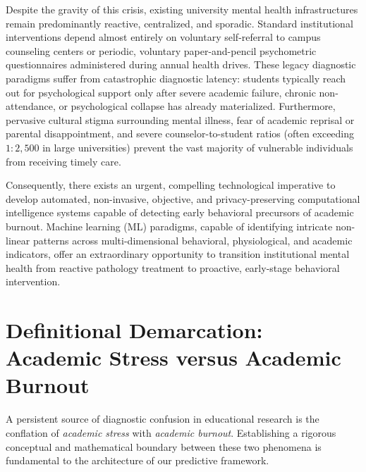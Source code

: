 \documentclass[12pt,a4paper,oneside]{report}
\begin{document}
Despite the gravity of this crisis, existing university mental health infrastructures remain predominantly reactive, centralized, and sporadic. Standard institutional interventions depend almost entirely on voluntary self-referral to campus counseling centers or periodic, voluntary paper-and-pencil psychometric questionnaires administered during annual health drives. These legacy diagnostic paradigms suffer from catastrophic diagnostic latency: students typically reach out for psychological support only after severe academic failure, chronic non-attendance, or psychological collapse has already materialized. Furthermore, pervasive cultural stigma surrounding mental illness, fear of academic reprisal or parental disappointment, and severe counselor-to-student ratios (often exceeding $1:2,500$ in large universities) prevent the vast majority of vulnerable individuals from receiving timely care.

Consequently, there exists an urgent, compelling technological imperative to develop automated, non-invasive, objective, and privacy-preserving computational intelligence systems capable of detecting early behavioral precursors of academic burnout. Machine learning (ML) paradigms, capable of identifying intricate non-linear patterns across multi-dimensional behavioral, physiological, and academic indicators, offer an extraordinary opportunity to transition institutional mental health from reactive pathology treatment to proactive, early-stage behavioral intervention.

\section{Definitional Demarcation: Academic Stress versus Academic Burnout}
\label{sec:stress_vs_burnout}
A persistent source of diagnostic confusion in educational research is the conflation of \emph{academic stress} with \emph{academic burnout}. Establishing a rigorous conceptual and mathematical boundary between these two phenomena is fundamental to the architecture of our predictive framework.
\end{document}
